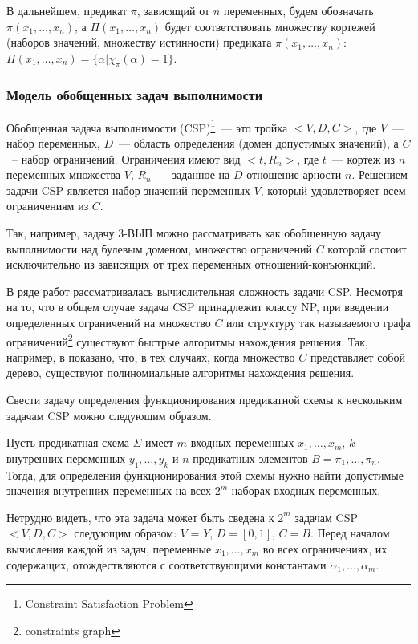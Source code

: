 \documentclass[12pt]{extarticle}
\newenvironment{definition}[1][Определение.]{\begin{trivlist}
\item[\hskip \labelsep {\bfseries #1}]}{\end{trivlist}}
\begin{document}
В дальнейшем, предикат $\pi$, зависящий от $n$ переменных, будем обозначать $\pi(x_1, \dots, x_n)$, а 
$\Pi(x_1, \dots, x_n)$ будет соответствовать множеству кортежей (наборов значений, множеству истинности) 
предиката $\pi(x_1, \dots, x_n)$: $\Pi(x_1, \dots, x_n) = \{ \alpha | \chi_{\pi}(\alpha) = 1 \}$.

\subsubsection*{Модель обобщенных задач выполнимости}

\begin{definition}
Обобщенная задача выполнимости (CSP)\footnote{Constraint Satisfaction Problem}~--- это тройка $<V,D,C>$, где $V$~--- набор переменных, $D$~--- область определения (домен допустимых значений), 
а $C$~-- набор ограничений. Ограничения имеют вид $<t, R_n>$, где $t$~--- кортеж из $n$ переменных множества $V$, 
$R_n$~--- заданное на $D$ отношение арности $n$. 
Решением задачи CSP является набор значений переменных $V$, который удовлетворяет всем ограничениям из $C$. 
\end{definition}

Так, например, задачу 3-ВЫП можно рассматривать как обобщенную задачу выполнимости над булевым доменом, множество
ограничений $C$ которой состоит исключительно из зависящих от трех переменных отношений-конъюнкций.

В ряде работ рассматривалась вычислительная сложность задачи CSP. Несмотря на то, что в общем случае задача CSP
принадлежит классу NP, при введении определенных ограничений на множество $C$ или структуру так называемого
графа ограничений\footnote{constraints graph} существуют быстрые алгоритмы нахождения решения. 
Так, например, в \cite{Shaeffer78} показано, 
что, в тех случаях, когда множество $C$ представляет собой дерево, существуют полиномиальные алгоритмы нахождения решения.

Свести задачу определения функционирования предикатной схемы к нескольким задачам CSP можно следующим образом.

Пусть предикатная схема $\Sigma$ имеет $m$ входных переменных $x_1, \ldots , x_m$, 
$k$ внутренних переменных $y_1, \ldots , y_k$ и $n$ предикатных элементов $B = \pi_1, \dots , \pi_n$. 
Тогда, для определения функционирования этой схемы нужно найти допустимые значения внутренних переменных на всех $2^{m}$
наборах входных переменных. 

Нетрудно видеть, что эта задача может быть сведена к $2^m$ задачам CSP $<V, D, C>$ следующим образом:
$V$ = $Y$, $D = [0, 1]$, $C = B$. Перед началом вычисления каждой из задач, переменные $x_1, \ldots , x_m$ 
во всех ограничениях, их содержащих, отождествляются с соответствующими константами $\alpha_1, \ldots , \alpha_m$.
\end{document}
